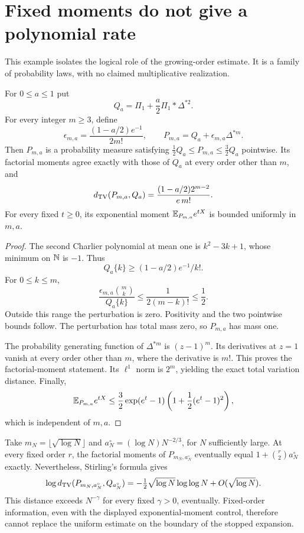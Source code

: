\section{Fixed moments do not give a polynomial rate}
\label{p1:moment-obstruction}

This example isolates the logical role of the growing-order
estimate. It is a family of probability laws, with no claimed
multiplicative realization.

\begin{proposition}
\label{p1:obstruction:fixed}
For \(0\le a\le1\) put
\[
 Q_a=\Pi_1+\frac a2\Pi_1*\Delta^{*2}.
\]
For every integer \(m\ge3\), define
\[
 \epsilon_{m,a}=\frac{(1-a/2)e^{-1}}{2m!},
 \qquad
 P_{m,a}=Q_a+\epsilon_{m,a}\Delta^{*m}.
\]
Then \(P_{m,a}\) is a probability measure satisfying
\(\frac12Q_a\le P_{m,a}\le\frac32Q_a\) pointwise.
Its factorial moments agree exactly with those of \(Q_a\)
at every order other than \(m\), and
\[
 d_{\mathrm{TV}}(P_{m,a},Q_a)
       =\frac{(1-a/2)2^{m-2}}{e\,m!}.
\]
For every fixed \(t\ge0\), its exponential moment
\(\mathbb E_{P_{m,a}}e^{tX}\) is bounded uniformly in \(m,a\).
\end{proposition}

\begin{proof}
The second Charlier polynomial at mean one is
\(k^2-3k+1\), whose minimum on \(\mathbb N\) is \(-1\).
Thus
\[
 Q_a\{k\}\ge(1-a/2)e^{-1}/k!.
\]
For \(0\le k\le m\),
\[
 \frac{\epsilon_{m,a}\binom mk}{Q_a\{k\}}
       \le\frac1{2(m-k)!}\le\frac12 .
\]
Outside this range the perturbation is zero. Positivity
and the two pointwise bounds follow. The perturbation
has total mass zero, so \(P_{m,a}\) has mass one.

The probability generating function of \(\Delta^{*m}\)
is \((z-1)^m\). Its derivatives at \(z=1\) vanish at
every order other than \(m\), where the derivative is
\(m!\). This proves the factorial-moment statement.
Its \(\ell^1\) norm is \(2^m\), yielding the exact
total variation distance. Finally,
\[
 \mathbb E_{P_{m,a}}e^{tX}
 \le\frac32
       \exp(e^t-1)\left(1+\frac12(e^t-1)^2\right),
\]
which is independent of \(m,a\).
\end{proof}

Take \(m_N=\lfloor\sqrt{\log N}\rfloor\) and
\(a_N^\circ=(\log N)N^{-2/3}\), for \(N\) sufficiently
large. At every fixed order \(r\), the factorial
moments of \(P_{m_N,a_N^\circ}\) eventually equal
\(1+\binom r2a_N^\circ\) exactly. Nevertheless,
Stirling's formula gives
\[
 \log d_{\mathrm{TV}}(P_{m_N,a_N^\circ},Q_{a_N^\circ})
   =-\tfrac12\sqrt{\log N}\log\log N
                   +O(\sqrt{\log N}).
\]
This distance exceeds \(N^{-\gamma}\) for every fixed
\(\gamma>0\), eventually. Fixed-order information,
even with the displayed exponential-moment control,
therefore cannot replace the uniform estimate on the
boundary of the stopped expansion.
